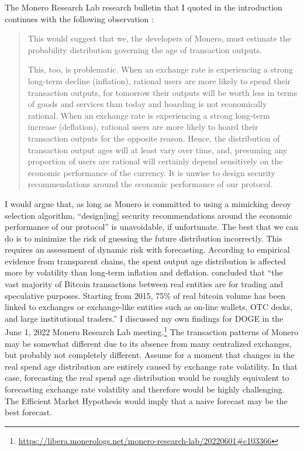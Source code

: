\documentclass[english]{article}
\begin{document}
The Monero Research Lab research bulletin that I quoted in the introduction
continues with the following observation \cite{Mackenzie2015}:
\begin{quote}
This would suggest that we, the developers of Monero, must estimate
the probability distribution governing the age of transaction outputs.

This, too, is problematic. When an exchange rate is experiencing a
strong long-term decline (inflation), rational users are more likely
to spend their transaction outputs, for tomorrow their outputs will
be worth less in terms of goods and services than today and hoarding
is not economically rational. When an exchange rate is experiencing
a strong long-term increase (deflation), rational users are more likely
to hoard their transaction outputs for the opposite reason. Hence,
the distribution of transaction output ages will at least vary over
time, and, presuming any proportion of users are rational will certainly
depend sensitively on the economic performance of the currency. It
is unwise to design security recommendations around the economic performance
of our protocol.
\end{quote}
I would argue that, as long as Monero is committed to using a mimicking
decoy selection algorithm, ``design{[}ing{]} security recommendations
around the economic performance of our protocol'' is unavoidable,
if unfortunate. The best that we can do is to minimize the risk of
guessing the future distribution incorrectly. This requires an assessment
of dynamic risk with forecasting. According to empirical evidence
from transparent chains, the spent output age distribution is affected
more by volatility than long-term inflation and deflation. \cite{MakarovSchoar2021}
concluded that ``the vast majority of Bitcoin transactions between
real entities are for trading and speculative purposes. Starting from
2015, 75\% of real bitcoin volume has been linked to exchanges or
exchange-like entities such as on-line wallets, OTC desks, and large
institutional traders.'' I discussed my own findings for DOGE in
the June 1, 2022 Monero Research Lab meeting.\footnote{\href{https://libera.monerologs.net/monero-research-lab/20220601\#c103366}{https://libera.monerologs.net/monero-research-lab/20220601\#c103366}}
The transaction patterns of Monero may be somewhat different due to
its absence from many centralized exchanges, but probably not completely
different. Assume for a moment that changes in the real spend age
distribution are entirely caused by exchange rate volatility. In that
case, forecasting the real spend age distribution would be roughly
equivalent to forecasting exchange rate volatility and therefore would
be highly challenging. The Efficient Market Hypothesis would imply
that a naive forecast may be the best forecast.
\end{document}
